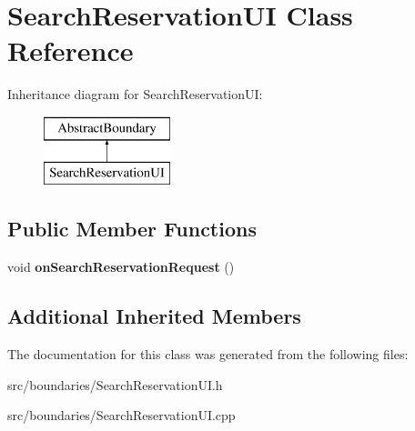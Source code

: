 \hypertarget{class_search_reservation_u_i}{}\section{Search\+Reservation\+UI Class Reference}
\label{class_search_reservation_u_i}
Inheritance diagram for Search\+Reservation\+UI\+:\begin{figure}[H]
\begin{center}
\leavevmode
\includegraphics[height=2.000000cm]{class_search_reservation_u_i}
\end{center}
\end{figure}
\subsection*{Public Member Functions}
\begin{DoxyCompactItemize}
\item 
\mbox{\label{class_search_reservation_u_i_af97ce0701730415b5ca8dd1d4ee44650}} 
void {\bfseries on\+Search\+Reservation\+Request} ()
\end{DoxyCompactItemize}
\subsection*{Additional Inherited Members}


The documentation for this class was generated from the following files\+:\begin{DoxyCompactItemize}
\item 
src/boundaries/Search\+Reservation\+U\+I.\+h\item 
src/boundaries/Search\+Reservation\+U\+I.\+cpp\end{DoxyCompactItemize}
